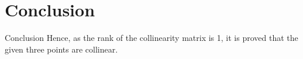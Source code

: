 \documentclass{beamer}
\theoremstyle{remark}
\begin{document}
\section{Conclusion}
\begin{frame}{Conclusion}
Hence, as the rank of the collinearity matrix is 1, it is proved that the given three points are collinear.

\end{frame}
\end{document}

